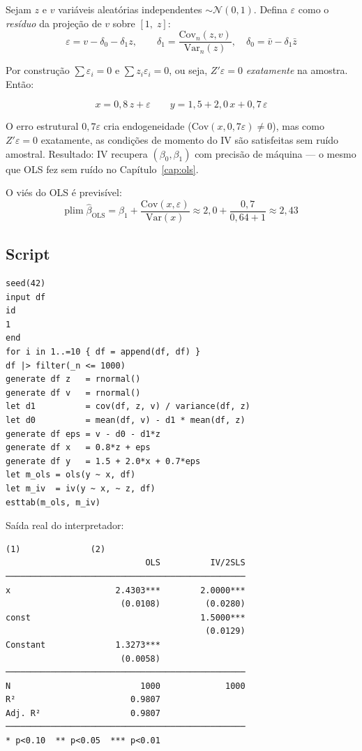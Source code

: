 Sejam $z$ e $v$ variáveis aleatórias independentes $\sim \mathcal{N}(0,1)$.
Defina $\varepsilon$ como o \emph{resíduo} da projeção de $v$ sobre $[1,\;z]$:
\[
  \varepsilon = v - \delta_0 - \delta_1 z,
  \qquad
  \delta_1 = \frac{\mathrm{Cov}_n(z,v)}{\mathrm{Var}_n(z)},
  \quad
  \delta_0 = \bar v - \delta_1\bar z
\]

Por construção $\sum \varepsilon_i = 0$ e $\sum z_i\varepsilon_i = 0$, ou seja,
$Z'\varepsilon = 0$ \emph{exatamente} na amostra. Então:

\[
  x = 0{,}8\,z + \varepsilon
  \qquad
  y = 1{,}5 + 2{,}0\,x + 0{,}7\,\varepsilon
\]

O erro estrutural $0{,}7\varepsilon$ cria endogeneidade ($\mathrm{Cov}(x,0{,}7\varepsilon) \neq 0$),
mas como $Z'\varepsilon = 0$ exatamente, as condições de momento do IV são
satisfeitas sem ruído amostral. Resultado: IV recupera $(\beta_0, \beta_1)$
com precisão de máquina — o mesmo que OLS fez sem ruído no Capítulo~\ref{cap:ols}.

O viés do OLS é previsível:
\[
  \mathrm{plim}\;\hat\beta_{\mathrm{OLS}}
  = \beta_1 + \frac{\mathrm{Cov}(x,\varepsilon)}{\mathrm{Var}(x)}
  \approx 2{,}0 + \frac{0{,}7}{0{,}64 + 1}
  \approx 2{,}43
\]

\subsection*{Script}

\begin{lstlisting}[caption={DGP com endogeneidade — OLS vs.\ IV}]
seed(42)
input df
id
1
end
for i in 1..=10 { df = append(df, df) }
df |> filter(_n <= 1000)
generate df z   = rnormal()
generate df v   = rnormal()
let d1          = cov(df, z, v) / variance(df, z)
let d0          = mean(df, v) - d1 * mean(df, z)
generate df eps = v - d0 - d1*z
generate df x   = 0.8*z + eps
generate df y   = 1.5 + 2.0*x + 0.7*eps
let m_ols = ols(y ~ x, df)
let m_iv  = iv(y ~ x, ~ z, df)
esttab(m_ols, m_iv)
\end{lstlisting}

\noindent Saída real do interpretador:

\begin{lstlisting}[language={}, basicstyle=\ttfamily\small,
  frame=none, numbers=none, backgroundcolor=\color{codbg},
  xleftmargin=0pt, xrightmargin=0pt, breaklines=false]
                            (1)              (2)
                            OLS          IV/2SLS
────────────────────────────────────────────────
x                     2.4303***        2.0000***
                       (0.0108)         (0.0280)
const                                  1.5000***
                                        (0.0129)
Constant              1.3273***
                       (0.0058)
────────────────────────────────────────────────
N                          1000             1000
R²                       0.9807
Adj. R²                  0.9807
────────────────────────────────────────────────
* p<0.10  ** p<0.05  *** p<0.01
\end{lstlisting}

